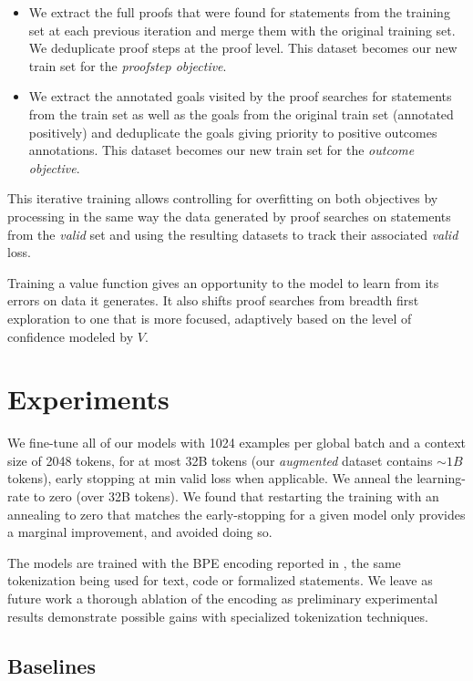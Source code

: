 \begin{itemize}
    \item  We extract the full proofs that were found for statements from the training set at each previous iteration and merge them with the original training set. We deduplicate proof steps at the proof level. This dataset becomes our new train set for the \textit{proofstep objective}.
    \item We extract the annotated goals visited by the proof searches for statements from the train set as well as the goals from the original train set (annotated positively) and deduplicate the goals giving priority to positive outcomes annotations. This dataset becomes our new train set for the \textit{outcome objective}.
\end{itemize}

This iterative training allows controlling for overfitting on both objectives by processing in the same way the data generated by proof searches on statements from the \textit{valid} set and using the resulting datasets to track their associated \textit{valid} loss.

Training a value function gives an opportunity to the model to learn from its errors on data it generates. It also shifts proof searches from breadth first exploration to one that is more focused, adaptively based on the level of confidence modeled by $V$.

\section{Experiments}
\label{section:experiments}

We fine-tune all of our models with 1024 examples per global batch and a context size of 2048 tokens, for at most 32B tokens (our \textit{augmented} dataset contains $\sim 1B$ tokens), early stopping at min valid loss when applicable. We anneal the learning-rate to zero (over 32B tokens). We found that restarting the training with an annealing to zero that matches the early-stopping for a given model only provides a marginal improvement, and avoided doing so.

The models are trained with the BPE encoding reported in \cite{brown2020language}, the same tokenization being used for text, code or formalized statements. We leave as future work a thorough ablation of the encoding as preliminary experimental results demonstrate possible gains with specialized tokenization techniques. 

\subsection{Baselines}

